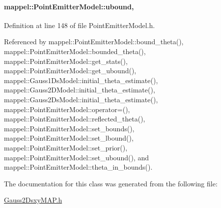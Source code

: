 \paragraph[{\texorpdfstring{ubound}{ubound}}]{ mappel\+::\+Point\+Emitter\+Model\+::ubound\hspace{0.3cm}{\ttfamily [protected]}, {\ttfamily [inherited]}}\hypertarget{classmappel_1_1PointEmitterModel_a35b883e84b6a2e0093bdf482c623beef}{}\label{classmappel_1_1PointEmitterModel_a35b883e84b6a2e0093bdf482c623beef}


Definition at line 148 of file Point\+Emitter\+Model.\+h.



Referenced by mappel\+::\+Point\+Emitter\+Model\+::bound\+\_\+theta(), mappel\+::\+Point\+Emitter\+Model\+::bounded\+\_\+theta(), mappel\+::\+Point\+Emitter\+Model\+::get\+\_\+stats(), mappel\+::\+Point\+Emitter\+Model\+::get\+\_\+ubound(), mappel\+::\+Gauss1\+Ds\+Model\+::initial\+\_\+theta\+\_\+estimate(), mappel\+::\+Gauss2\+D\+Model\+::initial\+\_\+theta\+\_\+estimate(), mappel\+::\+Gauss2\+Ds\+Model\+::initial\+\_\+theta\+\_\+estimate(), mappel\+::\+Point\+Emitter\+Model\+::operator=(), mappel\+::\+Point\+Emitter\+Model\+::reflected\+\_\+theta(), mappel\+::\+Point\+Emitter\+Model\+::set\+\_\+bounds(), mappel\+::\+Point\+Emitter\+Model\+::set\+\_\+lbound(), mappel\+::\+Point\+Emitter\+Model\+::set\+\_\+prior(), mappel\+::\+Point\+Emitter\+Model\+::set\+\_\+ubound(), and mappel\+::\+Point\+Emitter\+Model\+::theta\+\_\+in\+\_\+bounds().



The documentation for this class was generated from the following file\+:\begin{DoxyCompactItemize}
\item 
\hyperlink{Gauss2DsxyMAP_8h}{Gauss2\+Dsxy\+M\+A\+P.\+h}\end{DoxyCompactItemize}
